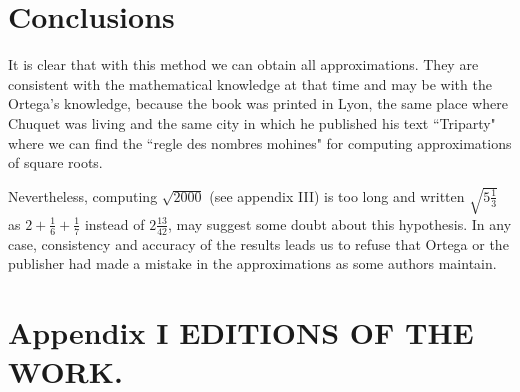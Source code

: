 \documentclass{amsart}
\begin{document}
\section{Conclusions}

It is clear that with this method we can obtain all approximations. They are consistent  with the mathematical knowledge at that time and may be with the Ortega's knowledge, because the book was printed in Lyon, the same place where Chuquet was living and the same city in which he published his text ``Triparty" where  we can find the ``regle des nombres mohines" for computing approximations of square roots.

Nevertheless, computing $\sqrt{2000}$ (see appendix III) is too long and written $\sqrt{5\frac 13}$ as $2+\frac 16+\frac 17$ instead of $2\frac{13}{42}$, may suggest some doubt about this hypothesis. In any case, consistency and accuracy of the results leads us to refuse that Ortega or the publisher had made a mistake in the approximations as some authors maintain.

\section{Appendix I
EDITIONS OF THE WORK.}
\end{document}
